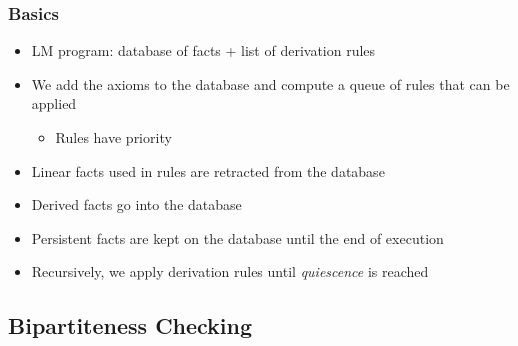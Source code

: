 \documentclass{beamer}
\begin{document}
\begin{frame}[fragile]
   \frametitle{Basics}
   \begin{itemize}
      \item LM program: database of facts + list of derivation rules
      \item We add the axioms to the database and compute a queue of rules that can be applied
      \begin{itemize}
         \item Rules have priority
      \end{itemize}
      \item Linear facts used in rules are retracted from the database
      \item Derived facts go into the database
      \item Persistent facts are kept on the database until the end of execution
      \item Recursively, we apply derivation rules until \emph{quiescence} is reached
   \end{itemize}
\end{frame}

\subsection{Bipartiteness Checking}
\end{document}
